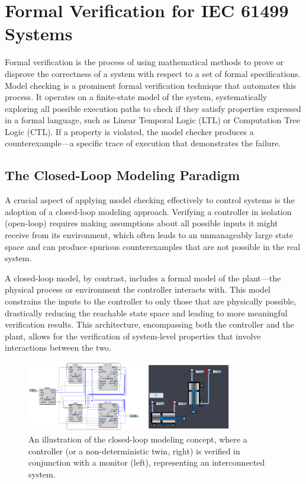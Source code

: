 \section{Formal Verification for IEC 61499 Systems}\label{sec:formal_verification}

Formal verification is the process of using mathematical methods to prove or disprove the correctness of a system with respect to a set of formal specifications. Model checking is a prominent formal verification technique that automates this process. It operates on a finite-state model of the system, systematically exploring all possible execution paths to check if they satisfy properties expressed in a formal language, such as Linear Temporal Logic (LTL) or Computation Tree Logic (CTL). If a property is violated, the model checker produces a counterexample—a specific trace of execution that demonstrates the failure.

\subsection{The Closed-Loop Modeling Paradigm}

A crucial aspect of applying model checking effectively to control systems is the adoption of a closed-loop modeling approach. Verifying a controller in isolation (open-loop) requires making assumptions about all possible inputs it might receive from its environment, which often leads to an unmanageably large state space and can produce spurious counterexamples that are not possible in the real system.

A closed-loop model, by contrast, includes a formal model of the plant—the physical process or environment the controller interacts with. This model constrains the inputs to the controller to only those that are physically possible, drastically reducing the reachable state space and leading to more meaningful verification results. This architecture, encompassing both the controller and the plant, allows for the verification of system-level properties that involve interactions between the two.

\begin{figure}[h]
\centering
\includegraphics[width=0.8\textwidth]{MX_Papers/Paper3/pic/wholesystem_withhmi.png}
\caption{An illustration of the closed-loop modeling concept, where a controller (or a non-deterministic twin, right) is verified in conjunction with a monitor (left), representing an interconnected system.}
\label{fig:closed_loop}
\end{figure}

